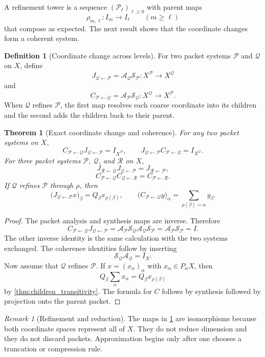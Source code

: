 \documentclass{aomart}
\newtheorem{theorem}{Theorem}[section]
\theoremstyle{definition}
\newtheorem{definition}[definition]{Definition}
\theoremstyle{remark}
\newtheorem{remark}[remark]{Remark}
\newcommand{\Acal}{\mathcal A}
\newcommand{\Pcal}{\mathcal P}
\newcommand{\Qcal}{\mathcal Q}
\newcommand{\Scal}{\mathcal S}
\newcommand{\Rcal}{\mathcal R}
\begin{document}
A refinement tower is a sequence $(\Pcal_\ell)_{\ell\geq0}$ with parent maps
\[
\rho_{m,\ell}:I_m\longrightarrow I_\ell
\qquad(m\geq\ell)
\]
that compose as expected.  The next result shows that the coordinate changes form a coherent system.

\begin{definition}[Coordinate change across levels]\label{def:coordinate_change}
For two packet systems $\Pcal$ and $\Qcal$ on $X$, define
\[
J_{\Qcal\leftarrow\Pcal}
=
\Acal_{\Qcal}\Scal_{\Pcal}:X^{\Pcal}\longrightarrow X^{\Qcal}
\]
and
\[
C_{\Pcal\leftarrow\Qcal}
=
\Acal_{\Pcal}\Scal_{\Qcal}:X^{\Qcal}\longrightarrow X^{\Pcal}.
\]
When $\Qcal$ refines $\Pcal$, the first map resolves each coarse coordinate into its children and the second adds the children back to their parent.
\end{definition}

\begin{theorem}[Exact coordinate change and coherence]\label{thm:coordinate_coherence}
For any two packet systems on $X$,
\[
C_{\Pcal\leftarrow\Qcal}J_{\Qcal\leftarrow\Pcal}=I_{X^{\Pcal}},
\qquad
J_{\Qcal\leftarrow\Pcal}C_{\Pcal\leftarrow\Qcal}=I_{X^{\Qcal}}.
\]
For three packet systems $\Pcal$, $\Qcal$, and $\Rcal$ on $X$,
\[
J_{\Rcal\leftarrow\Qcal}J_{\Qcal\leftarrow\Pcal}
=
J_{\Rcal\leftarrow\Pcal},
\]
\[
C_{\Pcal\leftarrow\Qcal}C_{\Qcal\leftarrow\Rcal}
=
C_{\Pcal\leftarrow\Rcal}.
\]
If $\Qcal$ refines $\Pcal$ through $\rho$, then
\[
\bigl(J_{\Qcal\leftarrow\Pcal}x\bigr)_\beta
=
Q_\beta x_{\rho(\beta)},
\qquad
\bigl(C_{\Pcal\leftarrow\Qcal}y\bigr)_\alpha
=
\sum_{\rho(\beta)=\alpha}y_\beta.
\]
\end{theorem}

\begin{proof}
The packet analysis and synthesis maps are inverse.  Therefore
\[
C_{\Pcal\leftarrow\Qcal}J_{\Qcal\leftarrow\Pcal}
=
\Acal_{\Pcal}\Scal_{\Qcal}\Acal_{\Qcal}\Scal_{\Pcal}
=
\Acal_{\Pcal}\Scal_{\Pcal}
=
I.
\]
The other inverse identity is the same calculation with the two systems exchanged.  The coherence identities follow by inserting
\[
\Scal_{\Qcal}\Acal_{\Qcal}=I_X.
\]
Now assume that $\Qcal$ refines $\Pcal$.  If $x=(x_\alpha)_\alpha$ with $x_\alpha\in P_\alpha X$, then
\[
Q_\beta\sum_\alpha x_\alpha
=
Q_\beta x_{\rho(\beta)}
\]
by \cref{thm:children_transitivity}.  The formula for $C$ follows by synthesis followed by projection onto the parent packet.
\end{proof}

\begin{remark}[Refinement and reduction]\label{rem:refinement_reduction}
The maps in \cref{thm:coordinate_coherence} are isomorphisms because both coordinate spaces represent all of $X$.  They do not reduce dimension and they do not discard packets.  Approximation begins only after one chooses a truncation or compression rule.
\end{remark}
\end{document}
